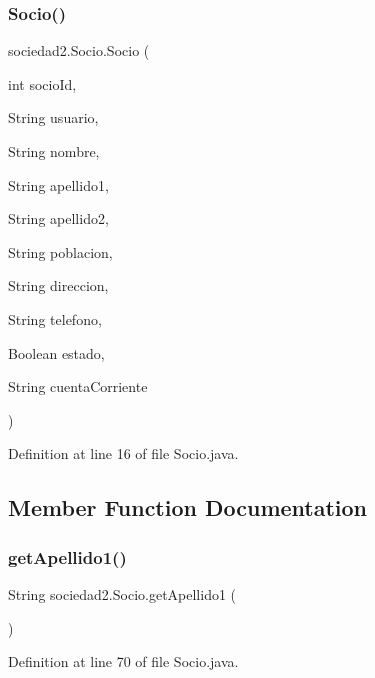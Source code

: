\subsubsection{\texorpdfstring{Socio()}{Socio()}}
{\footnotesize\ttfamily sociedad2.\+Socio.\+Socio (\begin{DoxyParamCaption}\item[{int}]{socio\+Id,  }\item[{String}]{usuario,  }\item[{String}]{nombre,  }\item[{String}]{apellido1,  }\item[{String}]{apellido2,  }\item[{String}]{poblacion,  }\item[{String}]{direccion,  }\item[{String}]{telefono,  }\item[{Boolean}]{estado,  }\item[{String}]{cuenta\+Corriente }\end{DoxyParamCaption})}



Definition at line 16 of file Socio.\+java.



\subsection{Member Function Documentation}
\mbox{\label{classsociedad2_1_1_socio_a29fb75c0c6ee59d395df5b7c72ea5352}} 
\subsubsection{\texorpdfstring{get\+Apellido1()}{getApellido1()}}
{\footnotesize\ttfamily String sociedad2.\+Socio.\+get\+Apellido1 (\begin{DoxyParamCaption}{ }\end{DoxyParamCaption})}



Definition at line 70 of file Socio.\+java.

\mbox{\label{classsociedad2_1_1_socio_a65cf03b87061bd1e976ec8139b48fdd3}} 
